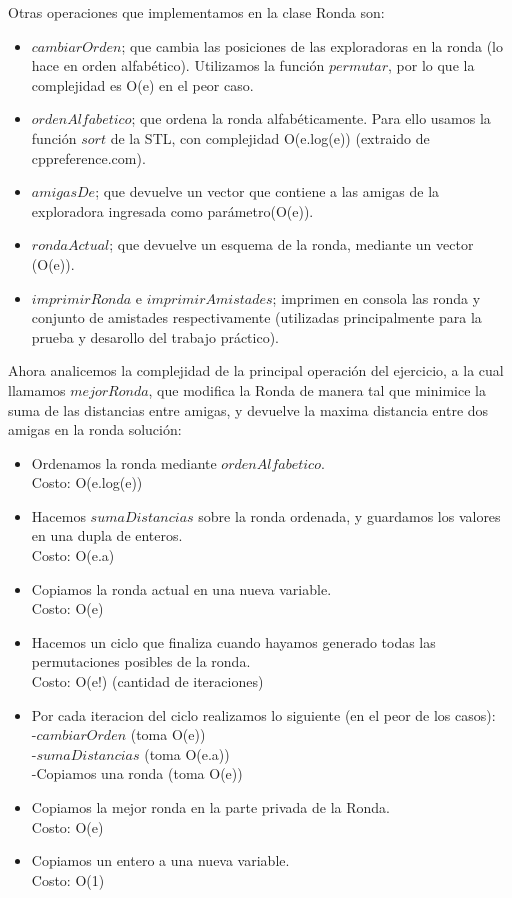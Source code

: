 Otras operaciones que implementamos en la clase Ronda son: 
\begin{itemize}
\item $cambiarOrden$; que cambia las posiciones de las exploradoras en la ronda (lo hace en orden alfabético). Utilizamos la función 
$permutar$, por lo que la complejidad es O(e) en el peor caso.
\item $ordenAlfabetico$; que ordena la ronda alfabéticamente. Para ello usamos la función $sort$ de la STL, con complejidad
O(e.log(e)) (extraido de cppreference.com).
\item $amigasDe$; que devuelve un vector que contiene a las amigas de la exploradora ingresada como parámetro(O(e)).
\item $rondaActual$; que devuelve un esquema de la ronda, mediante un vector (O(e)).
\item $imprimirRonda$ e $imprimirAmistades$; imprimen en consola las ronda y conjunto de amistades respectivamente (utilizadas
principalmente para la prueba y desarollo del trabajo práctico).  
\end{itemize}
Ahora analicemos la complejidad de la principal operación del ejercicio, a la cual llamamos $mejorRonda$, que modifica la Ronda de 
manera
tal que minimice la suma de las distancias entre amigas, y devuelve la maxima distancia entre dos amigas en la ronda solución: 
\begin{itemize}
\item Ordenamos la ronda mediante $ordenAlfabetico$. \\
Costo: O(e.log(e))
\item Hacemos $sumaDistancias$ sobre la ronda ordenada, y guardamos los valores en una dupla de enteros.\\
Costo: O(e.a)
\item Copiamos la ronda actual en una nueva variable. \\
Costo: O(e)
\item Hacemos un ciclo que finaliza cuando hayamos generado todas las permutaciones posibles de la ronda. \\
Costo: O(e!) (cantidad de iteraciones)
\item Por cada iteracion del ciclo realizamos lo siguiente (en el peor de los casos):\\
-$cambiarOrden$ (toma O(e)) \\
-$sumaDistancias$ (toma O(e.a)) \\
-Copiamos una ronda (toma O(e))
\item Copiamos la mejor ronda en la parte privada de la Ronda. \\
Costo: O(e)
\item Copiamos un entero a una nueva variable. \\
Costo: O(1)
\end{itemize}
